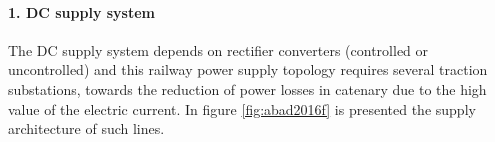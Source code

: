\paragraph{1. DC supply system\\}

The \ac{DC} supply system depends on rectifier converters (controlled or uncontrolled) and this railway power supply topology requires several traction substations, towards the reduction of power losses in catenary due to the high value of the electric current. In figure \ref{fig:abad2016f} is presented the supply architecture of such lines.

